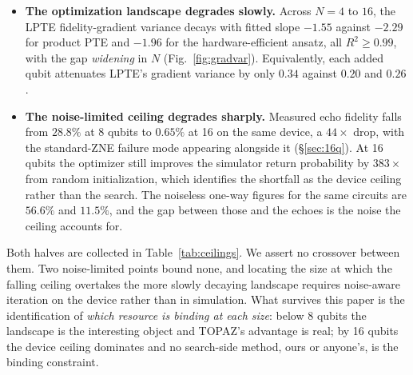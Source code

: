 \documentclass[twocolumn,aps,prl,superscriptaddress,showkeys]{revtex4-2}
\theoremstyle{plain}
\theoremstyle{definition}
\begin{document}
\begin{itemize}
\item \textbf{The optimization landscape degrades slowly.} Across $N=4$ to $16$, the LPTE fidelity-gradient variance decays with fitted slope $-1.55$ against $-2.29$ for product PTE and $-1.96$ for the hardware-efficient ansatz, all $R^2\ge0.99$, with the gap \emph{widening} in $N$ (Fig.~\ref{fig:gradvar}). Equivalently, each added qubit attenuates LPTE's gradient variance by only $0.34$ against $0.20$ and $0.26$.
\item \textbf{The noise-limited ceiling degrades sharply.} Measured echo fidelity falls from $28.8\%$ at 8 qubits to $0.65\%$ at 16 on the same device, a $44\times$ drop, with the standard-ZNE failure mode appearing alongside it (\S\ref{sec:16q}). At 16 qubits the optimizer still improves the simulator return probability by $383\times$ from random initialization, which identifies the shortfall as the device ceiling rather than the search. The noiseless one-way figures for the same circuits are $56.6\%$ and $11.5\%$, and the gap between those and the echoes is the noise the ceiling accounts for.
\end{itemize}

Both halves are collected in Table~\ref{tab:ceilings}. We assert no crossover between them. Two noise-limited points bound none, and locating the size at which the falling ceiling overtakes the more slowly decaying landscape requires noise-aware iteration on the device rather than in simulation. What survives this paper is the identification of \emph{which resource is binding at each size}: below 8 qubits the landscape is the interesting object and TOPAZ's advantage is real; by 16 qubits the device ceiling dominates and no search-side method, ours or anyone's, is the binding constraint.
\end{document}
